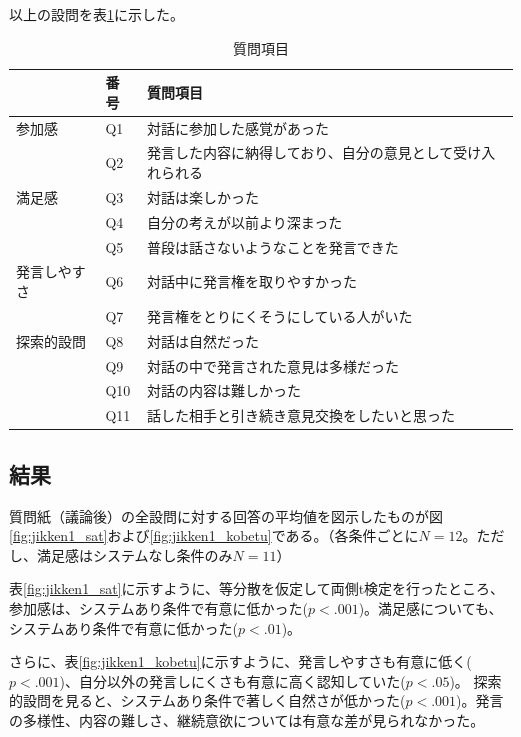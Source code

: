 \documentclass[11pt, a4paper]{jreport} %
\begin{document}
以上の設問を表\ref{tab:shitumon1}に示した。
\begin{table}[H]
\caption{質問項目}
\label{tab:shitumon1}
\begin{tabular}{@{}lll@{}}
\toprule
\multicolumn{1}{c}{} & 番号 & 質問項目                          \\ \midrule
参加感                  & Q1   & 対話に参加した感覚があった                 \\
                     & Q2   & 発言した内容に納得しており、自分の意見として受け入れられる \\
満足感                  & Q3   & 対話は楽しかった                      \\
                     & Q4   & 自分の考えが以前より深まった                \\
                     & Q5   & 普段は話さないようなことを発言できた            \\
発言しやすさ               & Q6   & 対話中に発言権を取りやすかった               \\
                     & Q7   & 発言権をとりにくそうにしている人がいた           \\
探索的設問                & Q8   & 対話は自然だった                      \\
                     & Q9   & 対話の中で発言された意見は多様だった            \\
                     & Q10  & 対話の内容は難しかった                   \\
                     & Q11  & 話した相手と引き続き意見交換をしたいと思った        \\ \bottomrule
\end{tabular}
\end{table}


\subsection{結果}
質問紙（議論後）の全設問に対する回答の平均値を図示したものが図\ref{fig:jikken1_sat}および\ref{fig:jikken1_kobetu}である。（各条件ごとに$N=12$。ただし、満足感はシステムなし条件のみ$N=11$）


表\ref{fig:jikken1_sat}に示すように、等分散を仮定して両側t検定を行ったところ、参加感は、システムあり条件で有意に低かった($p<.001$)。満足感についても、システムあり条件で有意に低かった($p<.01$)。


さらに、表\ref{fig:jikken1_kobetu}に示すように、発言しやすさも有意に低く($p<.001$)、自分以外の発言しにくさも有意に高く認知していた($p<.05$)。
探索的設問を見ると、システムあり条件で著しく自然さが低かった($p<.001$)。発言の多様性、内容の難しさ、継続意欲については有意な差が見られなかった。
\end{document}
